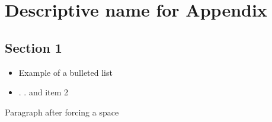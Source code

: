 \chapter{Descriptive name for Appendix}
\label{AppendixA}
 \graphicspath{{Appendix1/Appendix1Figs/PNG/}{Appendix1/Appendix1Figs/PDF/}{Appendix1/Appendix1Figs/}}



\clearpage   %

\section{Section 1}
\label{Ap1Sec1}

\begin{itemize}
\item
Example of a bulleted list
\item
 . . and item 2
\end{itemize}


\vspace{6 mm}   %

Paragraph after forcing a space





